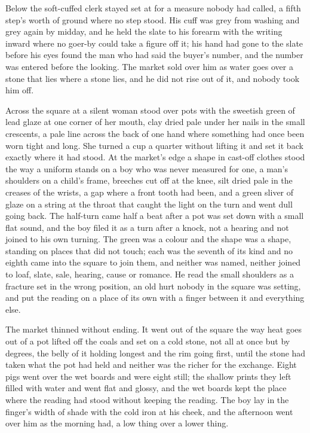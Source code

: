 Below  the soft-cuffed clerk stayed set at  for a measure nobody had called, a fifth step's worth of ground where no step stood. His cuff was grey from washing and grey again by midday, and he held the slate to his forearm with the writing inward where no goer-by could take a figure off it; his hand had gone to the slate before his eyes found the man who had said the buyer's number, and the number was entered before the looking. The market sold over him as water goes over a stone that lies where a stone lies, and he did not rise out of it, and nobody took him off.

Across the square at  a silent woman stood over pots with the sweetish green of lead glaze at one corner of her mouth, clay dried pale under her nails in the small crescents, a pale line across the back of one hand where something had once been worn tight and long. She turned a cup a quarter without lifting it and set it back exactly where it had stood. At the market's edge a shape in cast-off clothes stood the way a uniform stands on a boy who was never measured for one, a man's shoulders on a child's frame, breeches cut off at the knee, silt dried pale in the creases of the wrists, a gap where a front tooth had been, and a green sliver of glaze on a string at the throat that caught the light on the turn and went dull going back. The half-turn came half a beat after a pot was set down with a small flat sound, and the boy filed it as a turn after a knock, not a hearing and not joined to his own turning. The green was a colour and the shape was a shape, standing on places that did not touch; each was the seventh of its kind and no eighth came into the square to join them, and neither was named, neither joined to loaf, slate, sale, hearing, cause or romance. He read the small shoulders as a fracture set in the wrong position, an old hurt nobody in the square was setting, and put the reading on a place of its own with a finger between it and everything else.

The market thinned without ending. It went out of the square the way heat goes out of a pot lifted off the coals and set on a cold stone, not all at once but by degrees, the belly of it holding longest and the rim going first, until the stone had taken what the pot had held and neither was the richer for the exchange. Eight pigs went over the wet boards and were eight still; the shallow prints they left filled with water and went flat and glossy, and the wet boards kept the place where the reading had stood without keeping the reading. The boy lay in the finger's width of shade with the cold iron at his cheek, and the afternoon went over him as the morning had, a low thing over a lower thing.

